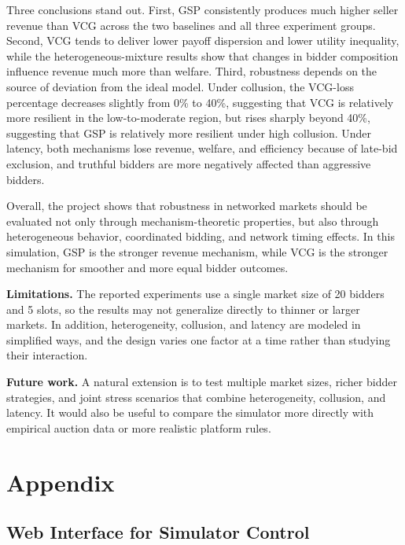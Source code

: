 \documentclass[12pt,a4paper]{article}
\begin{document}
Three conclusions stand out. First, GSP consistently produces much higher seller revenue than VCG across the two baselines and all three experiment groups. Second, VCG tends to deliver lower payoff dispersion and lower utility inequality, while the heterogeneous-mixture results show that changes in bidder composition influence revenue much more than welfare. Third, robustness depends on the source of deviation from the ideal model. Under collusion, the VCG-loss percentage decreases slightly from 0\% to 40\%, suggesting that VCG is relatively more resilient in the low-to-moderate region, but rises sharply beyond 40\%, suggesting that GSP is relatively more resilient under high collusion. Under latency, both mechanisms lose revenue, welfare, and efficiency because of late-bid exclusion, and truthful bidders are more negatively affected than aggressive bidders.

Overall, the project shows that robustness in networked markets should be evaluated not only through mechanism-theoretic properties, but also through heterogeneous behavior, coordinated bidding, and network timing effects. In this simulation, GSP is the stronger revenue mechanism, while VCG is the stronger mechanism for smoother and more equal bidder outcomes.

\textbf{Limitations.} The reported experiments use a single market size of 20 bidders and 5 slots, so the results may not generalize directly to thinner or larger markets. In addition, heterogeneity, collusion, and latency are modeled in simplified ways, and the design varies one factor at a time rather than studying their interaction.

\textbf{Future work.} A natural extension is to test multiple market sizes, richer bidder strategies, and joint stress scenarios that combine heterogeneity, collusion, and latency. It would also be useful to compare the simulator more directly with empirical auction data or more realistic platform rules.




\newpage
\section*{Appendix} \label{sec:appendix}

\subsection*{Web Interface for Simulator Control}
\end{document}
